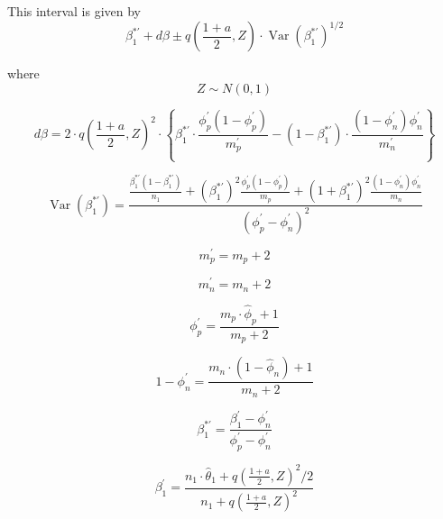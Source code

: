 \documentclass[AMA,STIX1COL]{WileyNJD-v2}
\DeclareMathOperator{\Var}{Var}
\begin{document}
This interval is given by
\begin{equation}
\beta_1^{*\prime} + d\beta \pm q\left( \frac{1 + a}{2}, Z \right) \cdot \Var(\beta_1^{*\prime})^{1/2}    
\end{equation}

where
\begin{equation}
   Z \sim N(0,1) 
\end{equation}

\begin{equation}
    d\beta = 2 \cdot q\left( \frac{1 + a}{2}, Z \right)^2 \cdot\left\{ \beta_1^{*\prime} \cdot \frac{\phi_p^\prime (1 - \phi_p^\prime)}{m_p^\prime} - (1 - \beta_1^{*\prime}) \cdot \frac{(1 - \phi_n^\prime) \phi_n^\prime}{m_n^\prime}  \right\}
\end{equation}

\begin{equation}
    \Var(\beta_1^{*\prime}) = \frac{ \frac{\beta_1^{*\prime}(1 - \beta_1^{*\prime})}{n_1} + \left(\beta_1^{*\prime}\right)^2 \frac{\phi_p^\prime (1 - \phi_p^\prime)}{m_p} + \left(1 + \beta_1^{*\prime}\right)^2 \frac{(1 - \phi_n^\prime) \phi_n^\prime}{ m_n}}{(\phi_p^\prime - \phi_n^\prime)^2}
\end{equation}

\begin{equation}
    m_p^\prime = m_p +2
\end{equation}

\begin{equation}
    m_n^\prime = m_n + 2
\end{equation}

\begin{equation}
    \phi_p^\prime = \frac{m_p \cdot \hat{\phi}_p + 1}{m_p + 2}
\end{equation}

\begin{equation}
   1 - \phi_n^\prime = \frac{m_n \cdot (1 - \hat{\phi}_n) + 1}{m_n + 2} 
\end{equation}

\begin{equation}
   \beta_1^{*\prime} = \frac{\beta_1^\prime - \phi_n^\prime}{\phi_p^\prime - \phi_n^\prime} 
\end{equation}

\begin{equation}
    \beta_1^\prime = \frac{n_1 \cdot \hat{\theta}_1 + q\left( \frac{1 + a}{2}, Z \right)^2 / 2}{n_1 + q\left( \frac{1 + a}{2}, Z \right)^2}
\end{equation}
\end{document}
